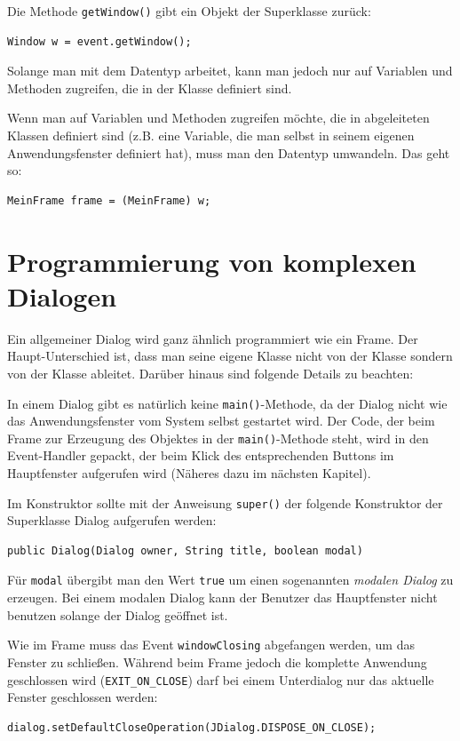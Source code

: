 Die Methode \lstinline|getWindow()| gibt ein Objekt der Superklasse
 zurück:

\begin{lstlisting}
Window w = event.getWindow();
\end{lstlisting}

Solange man mit dem Datentyp  arbeitet, kann man jedoch nur auf
Variablen und Methoden zugreifen, die in der Klasse  definiert
sind.

Wenn man auf Variablen und Methoden zugreifen möchte, die in abgeleiteten
Klassen definiert sind (z.B. eine Variable, die man selbst in seinem eigenen
Anwendungsfenster definiert hat), muss man den Datentyp umwandeln. Das geht so:

\begin{lstlisting}
MeinFrame frame = (MeinFrame) w;
\end{lstlisting}


\section{Programmierung von komplexen Dialogen}

Ein allgemeiner Dialog wird ganz ähnlich programmiert wie ein Frame. Der
Haupt-Unterschied ist, dass man seine eigene Klasse nicht von der Klasse
 sondern von der Klasse  ableitet. Darüber
hinaus sind folgende Details zu beachten:

\begin{compactitem}
\item In einem Dialog gibt es natürlich keine \lstinline|main()|-Methode, da der
Dialog nicht wie das Anwendungsfenster vom System selbst gestartet wird. Der
Code, der beim Frame zur Erzeugung des Objektes in der
\lstinline|main()|-Methode steht, wird in den Event-Handler gepackt, der beim
Klick des entsprechenden Buttons im Hauptfenster aufgerufen wird (Näheres dazu
im nächsten Kapitel).

\item Im Konstruktor sollte mit der Anweisung \lstinline|super()| der folgende
Konstruktor der Superklasse Dialog aufgerufen werden:

\begin{lstlisting}
public Dialog(Dialog owner, String title, boolean modal)
\end{lstlisting}

Für \lstinline|modal| übergibt man den Wert \lstinline|true| um einen
sogenannten {\em modalen Dialog} zu erzeugen. Bei einem modalen Dialog kann der
Benutzer das Hauptfenster nicht benutzen solange der Dialog geöffnet ist.

\item Wie im Frame muss das Event \lstinline|windowClosing| abgefangen werden,
um das Fenster zu schließen. Während beim Frame jedoch die komplette Anwendung
geschlossen wird (\lstinline|EXIT_ON_CLOSE|) darf bei einem Unterdialog nur das
aktuelle Fenster geschlossen werden:

\begin{lstlisting}
dialog.setDefaultCloseOperation(JDialog.DISPOSE_ON_CLOSE);
\end{lstlisting}
\end{compactitem}
